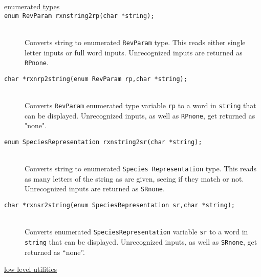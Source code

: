 \documentclass {scrbook}
\newcommand {\ttt} {\texttt}
\begin{document}
\begin{description}

\item[\underline{enumerated types}]

\item[\ttt{enum RevParam rxnstring2rp(char *string);}]
\hfill \\
Converts string to enumerated \ttt{RevParam} type. This reads either single letter inputs or full word inputs. Unrecognized inputs are returned as \ttt{RPnone}.

\item[\ttt{char *rxnrp2string(enum RevParam rp,char *string);}]
\hfill \\
Converts \ttt{RevParam} enumerated type variable \ttt{rp} to a word in \ttt{string} that can be displayed. Unrecognized inputs, as well as \ttt{RPnone}, get returned as "none".

\item[\ttt{enum SpeciesRepresentation rxnstring2sr(char *string);}]
\hfill \\
Converts string to enumerated \ttt{Species Representation} type. This reads as many letters of the string as are given, seeing if they match or not. Unrecognized inputs are returned as \ttt{SRnone}.

\item[\ttt{char *rxnsr2string(enum SpeciesRepresentation sr,char *string);}]
\hfill \\
Converts enumerated \ttt{SpeciesRepresentation} variable \ttt{sr} to a word in \ttt{string} that can be displayed. Unrecognized inputs, as well as \ttt{SRnone}, get returned as ``none''.

\item[\underline{low level utilities}]


\end{description}
\end{document}
